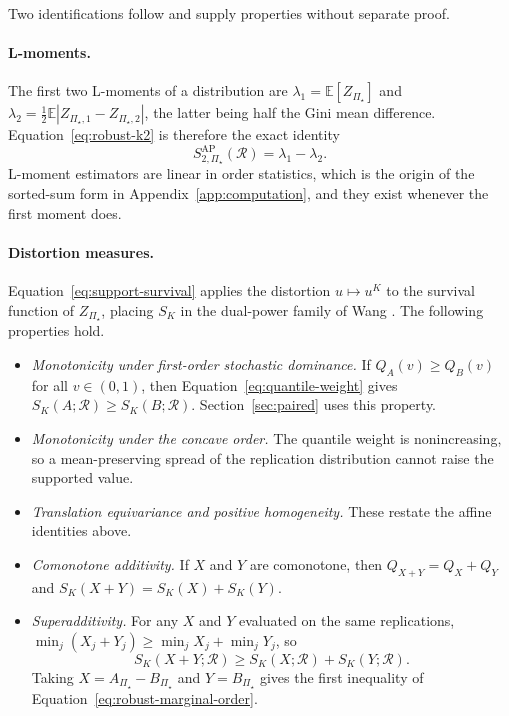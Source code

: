 \documentclass[11pt]{article}
\newcommand{\Regime}{\mathcal{R}}
\newcommand{\PSet}{\Pi_\star}
\newcommand{\E}{\mathbb{E}}
\theoremstyle{remark}
\begin{document}
Two identifications follow and supply properties without separate proof.

\paragraph{L-moments.}
The first two L-moments of a distribution \cite{hosking1990lmoments} are $\lambda_1=\E[Z_{\PSet}]$ and $\lambda_2=\tfrac12\E|Z_{\PSet,1}-Z_{\PSet,2}|$, the latter being half the Gini mean difference. Equation~\eqref{eq:robust-k2} is therefore the exact identity
\[
S_{2,\PSet}^{\mathrm{AP}}(\Regime)
=
\lambda_1-\lambda_2 .
\]
L-moment estimators are linear in order statistics, which is the origin of the sorted-sum form in Appendix~\ref{app:computation}, and they exist whenever the first moment does.

\paragraph{Distortion measures.}
Equation~\eqref{eq:support-survival} applies the distortion $u\mapsto u^{K}$ to the survival function of $Z_{\PSet}$, placing $S_K$ in the dual-power family of Wang \cite{wang1996premium}. The following properties hold.

\begin{itemize}
\item \emph{Monotonicity under first-order stochastic dominance.} If $Q_A(v)\geq Q_B(v)$ for all $v\in(0,1)$, then Equation~\eqref{eq:quantile-weight} gives $S_K(A;\Regime)\geq S_K(B;\Regime)$. Section~\ref{sec:paired} uses this property.
\item \emph{Monotonicity under the concave order.} The quantile weight is nonincreasing, so a mean-preserving spread of the replication distribution cannot raise the supported value.
\item \emph{Translation equivariance and positive homogeneity.} These restate the affine identities above.
\item \emph{Comonotone additivity.} If $X$ and $Y$ are comonotone, then $Q_{X+Y}=Q_X+Q_Y$ and $S_K(X+Y)=S_K(X)+S_K(Y)$.
\item \emph{Superadditivity.} For any $X$ and $Y$ evaluated on the same replications, $\min_j(X_j+Y_j)\geq\min_jX_j+\min_jY_j$, so
\[
S_K(X+Y;\Regime)
\geq
S_K(X;\Regime)+S_K(Y;\Regime).
\]
Taking $X=A_{\PSet}-B_{\PSet}$ and $Y=B_{\PSet}$ gives the first inequality of Equation~\eqref{eq:robust-marginal-order}.
\end{itemize}
\end{document}
